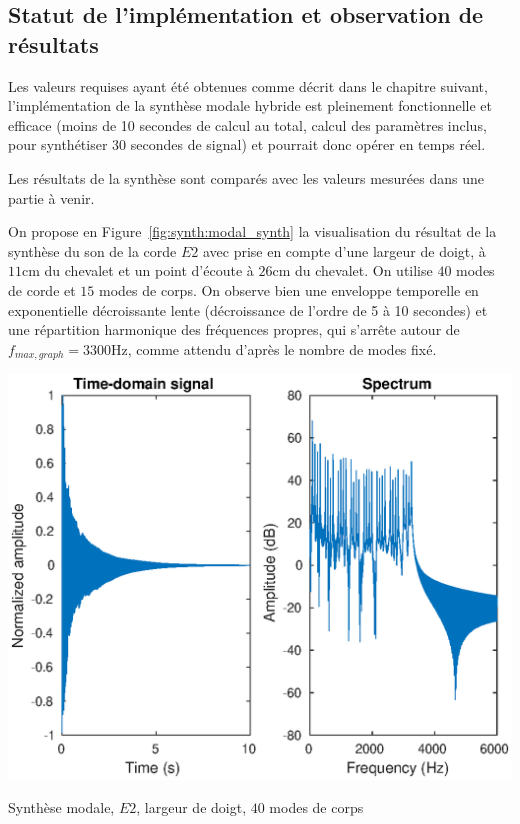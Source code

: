 \subsection{Statut de l'implémentation et observation de résultats}

Les valeurs requises ayant été obtenues comme décrit dans le chapitre suivant,
l'implémentation de la synthèse modale hybride est pleinement fonctionnelle
et efficace (moins de 10 secondes de calcul au total, calcul des paramètres
inclus, pour synthétiser 30 secondes de signal) et pourrait donc opérer en
temps réel.

Les résultats de la synthèse sont comparés avec les valeurs mesurées dans une
partie à venir.

On propose en Figure~\ref{fig:synth:modal_synth} la visualisation du résultat
de la synthèse du son de la corde \( E2 \) avec prise en compte d'une largeur
de doigt, à \( \si{11\cm} \) du chevalet et un point d'écoute à
\( \si{26\cm} \) du chevalet.
On utilise \( 40 \) modes de corde et \( 15 \) modes de corps.
On observe bien une enveloppe temporelle en exponentielle décroissante lente
(décroissance de l'ordre de 5 à 10 secondes) et une répartition harmonique
des fréquences propres, qui s'arrête autour de
\( f_{max, graph} = \si{3300\Hz} \), comme attendu d'après le nombre de modes
fixé.

\begin{table}[hpbt]
\centering
\includegraphics[scale=0.6]{figures/modal_synthesis-E2-40_string_modes-15_body_modes-finger_pluck.eps}
 \caption{Synthèse modale, \( E2 \), largeur de doigt, \( 40 \) modes de corps
 \label{fig:synth:modal_synth}}
\end{table}

